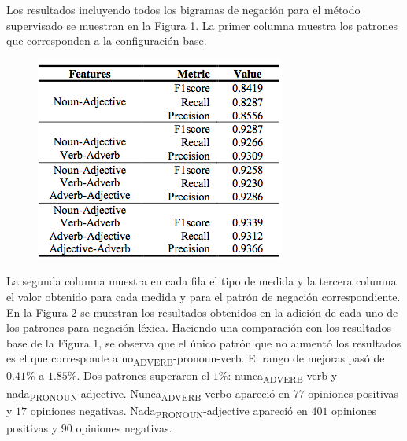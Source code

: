 \documentclass[a0,portrait]{a0poster}
\begin{document}
\begin{multicols}{2}
Los resultados incluyendo todos los bigramas de negación para el método supervisado se muestran en la Figura 1. La primer columna muestra los patrones que corresponden a la configuración base.
%
\begin{figure}
\begin{center}\vspace{0.5cm}
\includegraphics[width=1.0\linewidth]{tabla22.png}
\end{center}\vspace{0.5cm}
\end{figure}

La segunda columna muestra en cada fila el tipo de medida y la tercera columna el valor obtenido para cada medida y para el patrón de negación correspondiente. En la Figura 2 se muestran los resultados obtenidos en la adición de cada uno de los patrones para negación léxica. Haciendo una comparación con los resultados base de la Figura 1, se observa que el único patrón que no aumentó los resultados es el que corresponde a no\textsubscript{ADVERB}-pronoun-verb. El rango de mejoras pasó de $0.41\%$ a $1.85\%$. Dos patrones superaron el $1\%$: nunca\textsubscript{ADVERB}-verb y nada\textsubscript{PRONOUN}-adjective. Nunca\textsubscript{ADVERB}-verbo apareció en $77$ opiniones positivas y $17$ opiniones negativas. Nada\textsubscript{PRONOUN}-adjective apareció en $401$ opiniones positivas y $90$ opiniones negativas.


\end{multicols}
\end{document}
